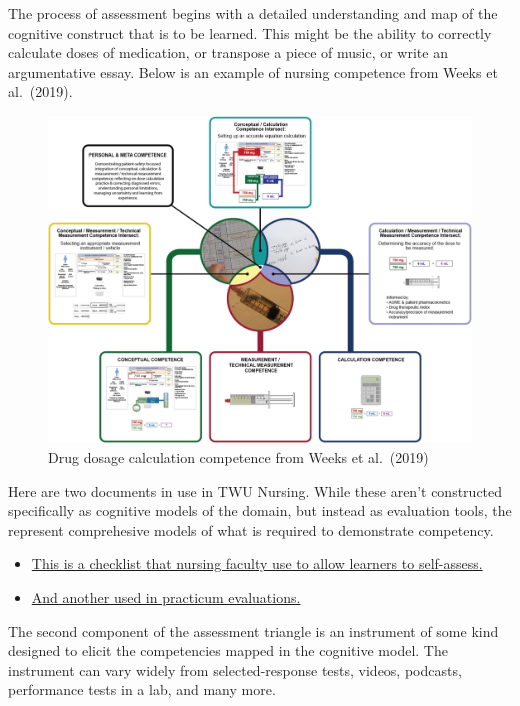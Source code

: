 \documentclass[
]{book}
\providecommand{\tightlist}{%
  \setlength{\itemsep}{0pt}\setlength{\parskip}{0pt}}
\begin{document}
The process of assessment begins with a detailed understanding and map of the cognitive construct that is to be learned. This might be the ability to correctly calculate doses of medication, or transpose a piece of music, or write an argumentative essay. Below is an example of nursing competence from Weeks et al.~(2019).

\begin{figure}
\centering
\includegraphics{assets/twu-asmt/nursing.jpg}
\caption{Drug dosage calculation competence from Weeks et al.~(2019)}
\end{figure}

Here are two documents in use in TWU Nursing. While these aren't constructed specifically as cognitive models of the domain, but instead as evaluation tools, the represent comprehesive models of what is required to demonstrate competency.

\begin{itemize}
\tightlist
\item
  \href{https://github.com/cmadland/decks/blob/main/assets/twu-asmt/mosby.pdf}{This is a checklist that nursing faculty use to allow learners to self-assess.}\\
\item
  \href{https://github.com/cmadland/decks/blob/main/assets/twu-asmt/n213.pdf}{And another used in practicum evaluations.}
\end{itemize}

The second component of the assessment triangle is an instrument of some kind designed to elicit the competencies mapped in the cognitive model. The instrument can vary widely from selected-response tests, videos, podcasts, performance tests in a lab, and many more.
\end{document}
